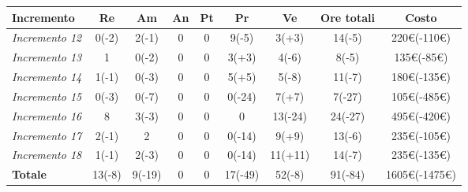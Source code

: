 \quad
\def\tabularxcolumn#1{m{#1}}
{

	\begin{center}
		\renewcommand{\arraystretch}{1.4}
		\begin{tabularx}{\textwidth}{|X|c|c|c|c|c|c|c|c|}
			\hline
			\rowcolor{airforceblue}
			\textbf{Incremento} & \textbf{Re} & \textbf{Am} & \textbf{An} & \textbf{Pt} & \textbf{Pr} & \textbf{Ve} & \textbf{Ore totali} & \textbf{Costo} \\
			\hline
			\textit{Incremento 12} & 0(-2) & 2(-1) & 0 & 0 & 9(-5) & 3(+3) & 14(-5) & 220\euro(-110\euro) \\
			\hline
			\textit{Incremento 13} & 1 & 0(-2) & 0 & 0 & 3(+3) & 4(-6) & 8(-5) & 135\euro(-85\euro) \\
			\hline
			\textit{Incremento 14} & 1(-1) & 0(-3) & 0 & 0 & 5(+5) & 5(-8) & 11(-7) & 180\euro(-135\euro) \\
			\textit{Incremento 15} & 0(-3) & 0(-7) & 0 & 0 & 0(-24) & 7(+7) & 7(-27) & 105\euro(-485\euro) \\
			\textit{Incremento 16} & 8 & 3(-3) & 0 & 0 & 0 & 13(-24) & 24(-27) & 495\euro(-420\euro) \\
			\textit{Incremento 17} & 2(-1) & 2 & 0 & 0 & 0(-14) & 9(+9) & 13(-6) & 235\euro(-105\euro) \\
			\hline
			\textit{Incremento 18} & 1(-1) & 2(-3) & 0 & 0 & 0(-14) & 11(+11) & 14(-7) & 235\euro(-135\euro) \\
			\hline
			\textbf{Totale} & 13(-8) & 9(-19) & 0 & 0 & 17(-49) & 52(-8) & 91(-84) & 1605\euro(-1475\euro) \\
			\hline
		\end{tabularx}
	\end{center}

\clearpage
}
